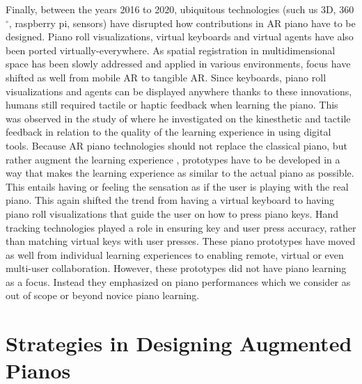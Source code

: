 \documentclass[sigchi, review]{acmart}
\let\xtodo\todo
\renewcommand{\todo}[1]{\xtodo[inline]{#1}}
\newcommand{\todos}[1]{\xtodo[inline,color=yellow!50]{Sven: #1}}
\begin{document}
Finally, between the years 2016 to 2020, ubiquitous technologies (such us 3D, 360$^{\circ}$, raspberry pi, sensors) have disrupted how contributions in AR piano have to be designed. Piano roll visualizations, virtual keyboards and virtual agents have also been ported virtually-everywhere. As spatial registration in multidimensional space has been slowly addressed \cite{roberts2011spatial,novotny2013applications, billinghurst2008tangible} and applied in various environments, focus have shifted as well from mobile AR to tangible AR. Since keyboards, piano roll visualizations and agents can be displayed anywhere thanks to these innovations, humans still required tactile or haptic feedback when learning the piano. This was observed in the study of \citet{hamam2013effect} where he investigated on the kinesthetic and tactile feedback in relation to the quality of the learning experience in using digital tools. Because AR piano technologies should not replace the classical piano, but rather augment the learning experience \cite{yang2020modern}, prototypes have to be developed in a way that makes the learning experience as similar to the actual piano as possible. This entails having or feeling the sensation as if the user is playing with the real piano. This again shifted the trend from having a virtual keyboard to having piano roll visualizations that guide the user on how to press piano keys. Hand tracking technologies played a role in ensuring key and user press accuracy, rather than matching virtual keys with user presses. These piano prototypes have moved as well from individual learning experiences to enabling remote, virtual or even multi-user collaboration. However, these prototypes did not have piano learning as a focus. Instead they emphasized on piano performances which we consider as out of scope or beyond novice piano learning. 

\todos{Add more here - a summary - outlook}

\section{Strategies in Designing Augmented Pianos}
\end{document}
